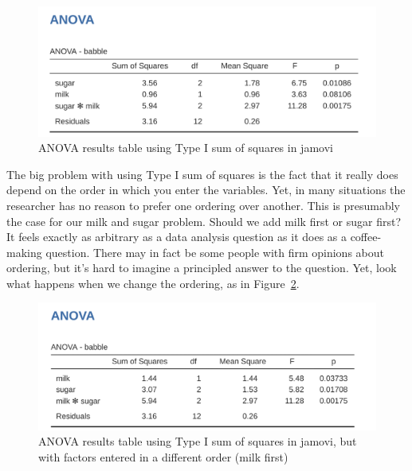 \documentclass[
  a4paper,
]{book}
\begin{document}
\begin{figure}

\includegraphics[width=1\textwidth,height=\textheight]{images/fig14-27.png} \hfill{}

\caption{\label{fig-fig14-27}ANOVA results table using Type I sum of
squares in jamovi}

\end{figure}

The big problem with using Type I sum of squares is the fact that it
really does depend on the order in which you enter the variables. Yet,
in many situations the researcher has no reason to prefer one ordering
over another. This is presumably the case for our milk and sugar
problem. Should we add milk first or sugar first? It feels exactly as
arbitrary as a data analysis question as it does as a coffee-making
question. There may in fact be some people with firm opinions about
ordering, but it's hard to imagine a principled answer to the question.
Yet, look what happens when we change the ordering, as in
Figure~\ref{fig-fig14-28}.

\begin{figure}

\includegraphics[width=1\textwidth,height=\textheight]{images/fig14-28.png} \hfill{}

\caption{\label{fig-fig14-28}ANOVA results table using Type I sum of
squares in jamovi, but with factors entered in a different order (milk
first)}

\end{figure}
\end{document}
